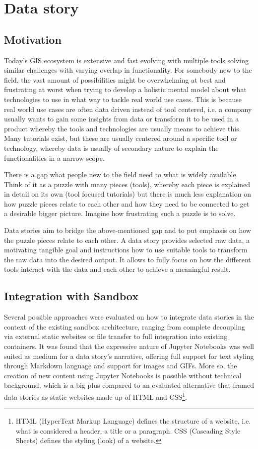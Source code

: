 \documentclass[11pt, a4paper, oneside, parskip=full-]{scrartcl}
\begin{document}
\section{Data story}

\subsection{Motivation}
Today's GIS ecosystem is extensive and fast evolving with multiple tools solving
similar challenges with varying overlap in functionality. For somebody new to
the field, the vast amount of possibilities might be overwhelming at best and
frustrating at worst when trying to develop a holistic mental model about what
technologies to use in what way to tackle real world use cases. This is because
real world use cases are often data driven instead of tool centered, i.e. a
company usually wants to gain some insights from data or transform it to be used
in a product whereby the tools and technologies are usually means to achieve
this. Many tutorials exist, but these are usually centered around a specific
tool or technology, whereby data is usually of secondary nature to explain the
functionalities in a narrow scope.

There is a gap what people new to the field need to what is widely available.
Think of it as a puzzle with many pieces (tools), whereby each piece is
explained in detail on its own (tool focused tutorials) but there is much less
explanation on how puzzle pieces relate to each other and how they need to be
connected to get a desirable bigger picture. Imagine how frustrating such a
puzzle is to solve.

Data stories aim to bridge the above-mentioned gap and to put emphasis on how
the puzzle pieces relate to each other. A data story provides selected raw data,
a motivating tangible goal and instructions how to use suitable tools to
transform the raw data into the desired output. It allows to fully focus on how
the different tools interact with the data and each other to achieve a
meaningful result.

\subsection{Integration with Sandbox}
Several possible approaches were evaluated on how to integrate data stories in
the context of the existing sandbox architecture, ranging from complete
decoupling via external static websites or file transfer to full integration
into existing containers. It was found that the expressive nature of Jupyter
Notebooks was well suited as medium for a data story's narrative, offering full
support for text styling through Markdown language and support for images and
GIFs. More so, the creation of new content using Jupyter Notebooks is possible
without technical background, which is a big plus compared to an evaluated
alternative that framed data stories as static websites made up of HTML and
CSS\footnote{HTML (HyperText Markup Language) defines the structure of a
website, i.e. what is considered a header, a title or a paragraph. CSS
(Cascading Style Sheets) defines the styling (look) of a website.}.
\end{document}
